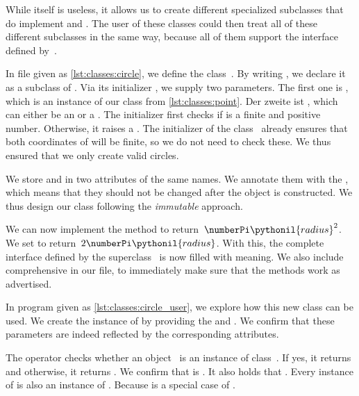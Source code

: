 While  itself is useless, it allows us to create different specialized subclasses that do implement  and .
The user of these classes could then treat all of these different subclasses in the same way, because all of them support the interface defined by~.

In file  given as \cref{lst:classes:circle}, we define the class~.
By writing , we declare it as a subclass of .
Via its initializer , we supply two parameters.
The first one is , which is an instance of our class  from \cref{lst:classes:point}.
Der zweite ist , which can either be an  or a .
The initializer first checks if  is a finite and positive number.
Otherwise, it raises a .
The initializer of the class~ already ensures that both coordinates of  will be finite, so we do not need to check these.
We thus ensured that we only create valid circles.

We store  and  in two attributes of the same names.
We annotate them with the  , which means that they should not be changed after the object is constructed.
We thus design our class following the \emph{immutable} approach.

We can now implement the method  to return~$\numberPi\pythonil{radius}^2$.
We set  to return~$2\numberPi\pythonil{radius}$.
With this, the complete interface defined by the superclass~ is now filled with meaning.
We also include comprehensive  in our file, to immediately make sure that the methods work as advertised.

In program  given as \cref{lst:classes:circle_user}, we explore how this new class can be used.
We create the instance  of  by providing the  and .
We confirm that these parameters are indeed reflected by the corresponding attributes.

The operator  checks whether an object~ is an instance of class~.
If yes, it returns  and otherwise, it returns .
We confirm that  is .
It also holds that .
Every instance of  is also an instance of .
Because  is a special case of .

